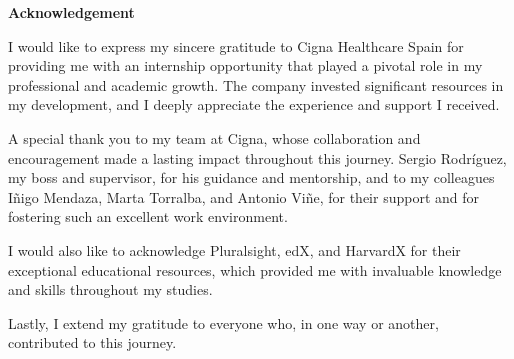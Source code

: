 \begin{center}
    {\large \textbf{Acknowledgement}} \vspace{2cm}
\end{center}

    I would like to express my sincere gratitude to Cigna Healthcare Spain for providing me with an internship opportunity that played a pivotal role in my professional and academic growth. The company invested significant resources in my development, and I deeply appreciate the experience and support I received.

    A special thank you to my team at Cigna, whose collaboration and encouragement made a lasting impact throughout this journey. Sergio Rodríguez, my boss and supervisor, for his guidance and mentorship, and to my colleagues Iñigo Mendaza, Marta Torralba, and Antonio Viñe, for their support and for fostering such an excellent work environment.

    I would also like to acknowledge Pluralsight, edX, and HarvardX for their exceptional educational resources, which provided me with invaluable knowledge and skills throughout my studies.

    Lastly, I extend my gratitude to everyone who, in one way or another, contributed to this journey.
